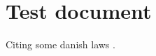 \documentclass{article}
\begin{document}
\section{Test document}
Citing some danish laws \cite{barnetslov119stk2,straffeloven116stk2,lovomsocialservice188stk1,lovomretssikkerhedogadministrationpdetsocialeomrde12astk8,lovomrettenspleje126stk2,konkurrenceloven15astk2,forldreansvarsloven18stk1}.


\printbibliography
\end{document}
